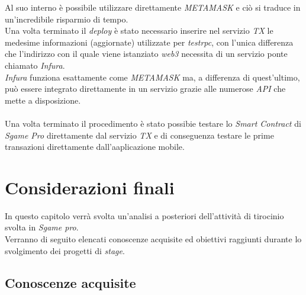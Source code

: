 \documentclass[11pt]{thesistemp}
\begin{document}
Al suo interno è possibile utilizzare direttamente \textit{METAMASK} e ciò si traduce in un'incredibile risparmio di tempo.\\
Una volta terminato il \textit{deploy} è stato necessario inserire nel servizio \textit{TX} le medesime informazioni (aggiornate) utilizzate per \textit{testrpc}, con l'unica differenza che l'indirizzo con il quale viene istanziato \textit{web3} necessita di un servizio ponte chiamato \textit{Infura}.\\
\textit{Infura} funziona esattamente come \textit{METAMASK} ma, a differenza di quest'ultimo, può essere integrato direttamente in un servizio grazie alle numerose \textit{API} che mette a disposizione.\\\\
Una volta terminato il procedimento è stato possibie testare lo \textit{Smart Contract} di  \textit{Sgame Pro} direttamente dal servizio \textit{TX} e di conseguenza testare le prime transazioni direttamente dall'aaplicazione mobile.

\section{Considerazioni finali}

In questo capitolo verrà svolta un’analisi a posteriori dell’attività di tirocinio svolta in \textit{Sgame pro}.\\
Verranno di seguito elencati conoscenze acquisite ed obiettivi raggiunti durante lo svolgimento dei progetti di \textit{stage}.

\subsection{Conoscenze acquisite}
\end{document}

